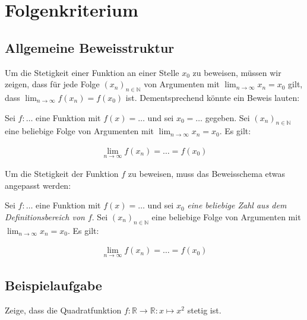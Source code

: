 \documentclass[fontsize=9pt,
               parskip=half-,
               DIV=14,
               listof=chapterentry,
               tocflat]{scrbook}
\begin{document}
\section{Folgenkriterium}

\subsection{Allgemeine Beweisstruktur}

Um die Stetigkeit einer Funktion an einer Stelle $x_{0}$ zu beweisen, müssen wir zeigen, dass für jede Folge $(x_{n})_{n\in \mathbb {N} }$ von Argumenten mit $\lim _{n\to \infty }x_{n}=x_{0}$ gilt, dass $\lim _{n\to \infty }f(x_{n})=f(x_{0})$ ist. Dementsprechend könnte ein Beweis lauten:

\begin{importantparagraph*}
Sei $f:\ldots $ eine Funktion mit $f(x)=\ldots $ und sei $x_{0}=\ldots $ gegeben. Sei $(x_{n})_{n\in \mathbb {N} }$ eine beliebige Folge von Argumenten mit $\lim _{n\to \infty }x_{n}=x_{0}$. Es gilt:

\begin{align*}
\lim _{n\to \infty }f(x_{n})=\ldots =f(x_{0})
\end{align*}

\end{importantparagraph*}

Um die Stetigkeit der Funktion $f$ zu beweisen, muss das Beweisschema etwas angepasst werden:

\begin{importantparagraph*}
Sei $f:\ldots $ eine Funktion mit $f(x)=\ldots $ und sei $x_{0}$ \emph{eine beliebige Zahl aus dem Definitionsbereich von $f$}. Sei $(x_{n})_{n\in \mathbb {N} }$ eine beliebige Folge von Argumenten mit $\lim _{n\to \infty }x_{n}=x_{0}$. Es gilt:

\begin{align*}
\lim _{n\to \infty }f(x_{n})=\ldots =f(x_{0})
\end{align*}

\end{importantparagraph*}

\subsection{Beispielaufgabe}

\begin{exercise*}
Zeige, dass die Quadratfunktion $f:\mathbb {R} \to \mathbb {R} :x\mapsto x^{2}$ stetig ist.

\end{exercise*}
\end{document}
